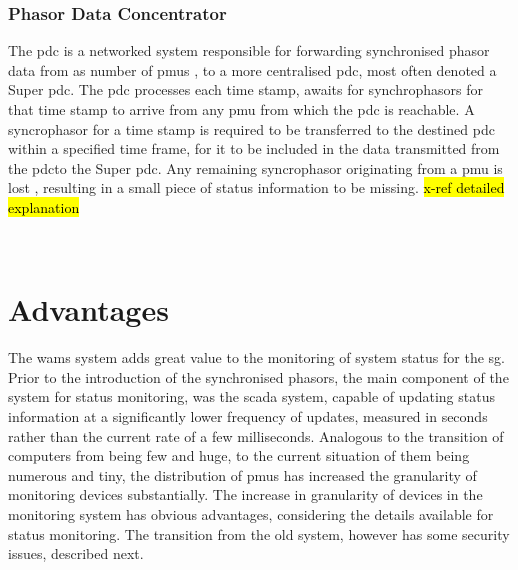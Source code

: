 \subsubsection{Phasor Data Concentrator}

The \acrfull{pdc} is a networked system responsible for forwarding synchronised phasor data from as number of \acrshort{pmu}s 
, to a more centralised \acrshort{pdc}, most often denoted a Super \acrshort{pdc}. The \acrshort{pdc} processes each time stamp, awaits for synchrophasors for that time stamp to arrive from any \acrshort{pmu} from which the \acrshort{pdc} is reachable. A syncrophasor for a time stamp is required to be transferred to the destined \acrshort{pdc} within a specified time frame, for it to be included in the data transmitted from the \acrshort{pdc}to the Super \acrshort{pdc}. Any remaining syncrophasor originating from a \acrshort{pmu} is lost
, resulting in a small piece of status information to be missing. \hl{x-ref detailed explanation}

\
 






\section{Advantages}
The \acrshort{wams} system adds great value to the monitoring of system status for the \acrlong{sg}. Prior to the introduction of the synchronised phasors, the main component of the system for status monitoring, was the \acrshort{scada} system, capable of updating status information at a significantly lower frequency of updates, measured in seconds rather than the current rate of a few milliseconds. Analogous to the transition of computers from being few and huge, to the current situation of them being numerous and tiny, the distribution of \acrshort{pmu}s has increased the granularity of monitoring devices substantially.
The increase in granularity of devices in the monitoring system has obvious advantages, considering the details available for status monitoring. The transition from the old system, however has some security issues, described next.

